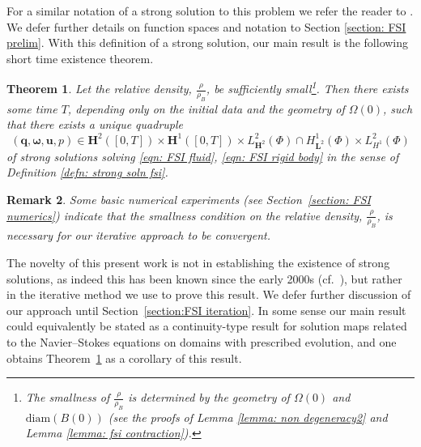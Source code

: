 \documentclass[a4paper]{amsart}
\numberwithin{equation}{section}
\theoremstyle{plain}
\newtheorem{theorem}{Theorem}[section]
\newtheorem{remark}[theorem]{Remark}
\newcommand{\mbf}[1]{\mathbf{#1}}
\begin{document}
For a similar notation of a strong solution to this problem we refer the reader to \cite[Definition 2.1]{takahashi2003analysis}.
We defer further details on function spaces and notation to Section \ref{section: FSI prelim}.
With this definition of a strong solution, our main result is the following short time existence theorem.
\begin{theorem}
	\label{thm: FSI existence}
    Let the relative density, $\frac{\rho}{\rho_B}$, be sufficiently small\footnote{The smallness of $\frac{\rho}{\rho_B}$ is determined by the geometry of $\Omega(0)$ and $\mathrm{diam}(B(0))$ (see the proofs of Lemma \ref{lemma: non degeneracy2} and Lemma \ref{lemma: fsi contraction}).}.
    Then there exists some time $T$, depending only on the initial data and the geometry of $\Omega(0)$, such that there exists a unique quadruple
	\[(\mbf{q}, \boldsymbol{\omega}, \mbf{u}, p) \in \mbf{H}^2([0,T]) \times \mbf{H}^1([0,T]) \times L^2_{\mbf{H}^2}(\Phi)\cap H^1_{\mbf{L}^2}(\Phi) \times L^2_{H^1}(\Phi)\]
	of strong solutions solving \eqref{eqn: FSI fluid}, \eqref{eqn: FSI rigid body} in the sense of Definition \ref{defn: strong soln fsi}.
\end{theorem}
\begin{remark}
    Some basic numerical experiments (see Section~\ref{section: FSI numerics}) indicate that the smallness condition on the relative density, $\frac{\rho}{\rho_B}$, is necessary for our iterative approach to be convergent.
\end{remark}
The novelty of this present work is not in establishing the existence of strong solutions, as indeed this has been known since the early 2000s (cf.~\cite{grandmont2000existence, takahashi2003analysis}), but rather in the iterative method we use to prove this result.
We defer further discussion of our approach until Section~\ref{section:FSI iteration}.
In some sense our main result could equivalently be stated as a continuity-type result for solution maps related to the Navier--Stokes equations on domains with prescribed evolution, and one obtains Theorem~\ref{thm: FSI existence} as a corollary of this result.
\end{document}
